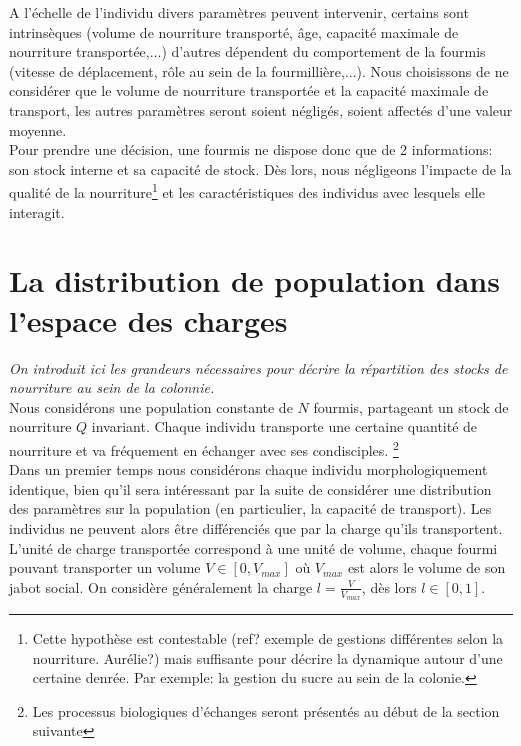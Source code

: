 A l'échelle de l'individu divers paramètres peuvent intervenir, certains sont intrinsèques (volume de nourriture transporté, âge, capacité maximale de nourriture transportée,...) d'autres dépendent du comportement de la fourmis (vitesse de déplacement, rôle au sein de la fourmillière,...). Nous choisissons de ne considérer que le volume de nourriture transportée et la capacité maximale de transport, les autres paramètres seront soient négligés, soient affectés d'une valeur moyenne.\\

Pour prendre une décision, une fourmis ne dispose donc que de 2 informations: son stock interne et sa capacité de stock. Dès lors, nous négligeons l'impacte de la qualité de la nourriture\footnote{Cette hypothèse est contestable (ref? exemple de gestions différentes selon la nourriture. Aurélie?) mais suffisante pour décrire la dynamique autour d'une certaine denrée. Par exemple: la gestion du sucre au sein de la colonie.} et les caractéristiques des individus avec lesquels elle interagit. \\




\section{La distribution de population dans l'espace des charges}
\textit{On introduit ici les grandeurs nécessaires pour décrire la répartition des stocks de nourriture au sein de la colonnie.}\\

Nous considérons une population constante de $N$ fourmis, partageant un stock de nourriture $Q$ invariant. Chaque individu transporte une certaine quantité de nourriture  et va fréquement en échanger avec ses condisciples. \footnote{Les processus biologiques d'échanges seront présentés au début de la section suivante} \\

Dans un premier temps nous considérons chaque individu morphologiquement identique, bien qu'il sera intéressant par la suite de considérer une distribution des paramètres sur la population (en particulier, la capacité de transport). Les individus ne peuvent alors être différenciés que par la charge qu'ils transportent.\\

L'unité de charge transportée correspond à une unité de volume, chaque fourmi pouvant transporter un volume $V\in[0,V_{max}]$ où $V_{max}$ est alors le volume de son jabot social. On considère généralement la charge $l=\frac{V}{V_{max}}$, dès lors $l\in[0,1]$.\\

